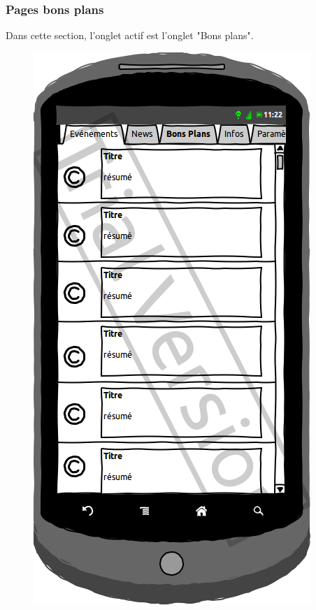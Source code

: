 \documentclass[a4paper, 11px]{article}
\begin{document}
\subsubsection{Pages bons plans}
Dans cette section, l'onglet actif est l'onglet "Bons plans".
\begin{figure}[htbp]
	\begin{minipage}[c]{.50\linewidth}
		\begin{center}
			\includegraphics[scale=0.3]{../../Sketch/Android/BP.png}
		\end{center}
	\end{minipage}
	\hfill
	\begin{minipage}[c]{.50\linewidth}
		\begin{center}

\end{center}
\end{minipage}
\end{figure}
\end{document}
